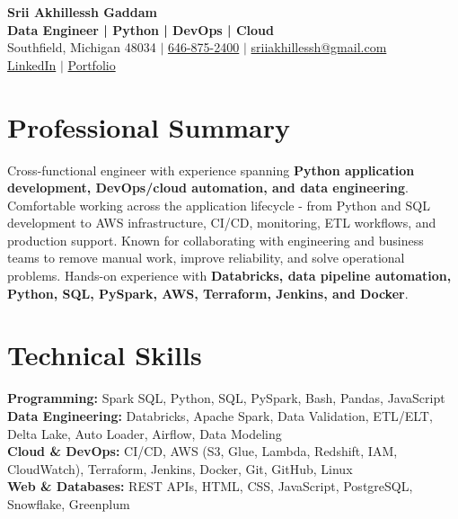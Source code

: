 \documentclass[letterpaper,10pt]{article}
\begin{document}
\fontsize{9.35pt}{10.45pt}\selectfont

\begin{center}
    {\LARGE \textbf{Srii Akhillessh Gaddam}} \\[-1pt]
    \textbf{Data Engineer | Python | DevOps | Cloud} \\[2pt]
    Southfield, Michigan 48034 $|$
    \href{tel:6468752400}{646-875-2400} $|$
    \href{mailto:sriiakhillessh@gmail.com}{sriiakhillessh@gmail.com} \\[1pt]
    \href{https://www.linkedin.com/in/srii-akhiilessh-gaddam-b48668191/}{LinkedIn} $|$
    \href{https://sriiakhillesshg.github.io/portfolio/}{Portfolio}
\end{center}
\vspace{-8pt}

\section{Professional Summary}
\small{Cross-functional engineer with experience spanning \textbf{Python application development, DevOps/cloud automation, and data engineering}. Comfortable working across the application lifecycle - from Python and SQL development to AWS infrastructure, CI/CD, monitoring, ETL workflows, and production support. Known for collaborating with engineering and business teams to remove manual work, improve reliability, and solve operational problems. Hands-on experience with \textbf{Databricks, data pipeline automation, Python, SQL, PySpark, AWS, Terraform, Jenkins, and Docker}.}

\section{Technical Skills}
\small{
\textbf{Programming:} Spark SQL, Python, SQL, PySpark, Bash, Pandas, JavaScript \\
\textbf{Data Engineering:} Databricks, Apache Spark, Data Validation, ETL/ELT, Delta Lake, Auto Loader, Airflow, Data Modeling \\
\textbf{Cloud \& DevOps:} CI/CD, AWS (S3, Glue, Lambda, Redshift, IAM, CloudWatch), Terraform, Jenkins, Docker, Git, GitHub, Linux \\
\textbf{Web \& Databases:} REST APIs, HTML, CSS, JavaScript, PostgreSQL, Snowflake, Greenplum
}

\end{document}
